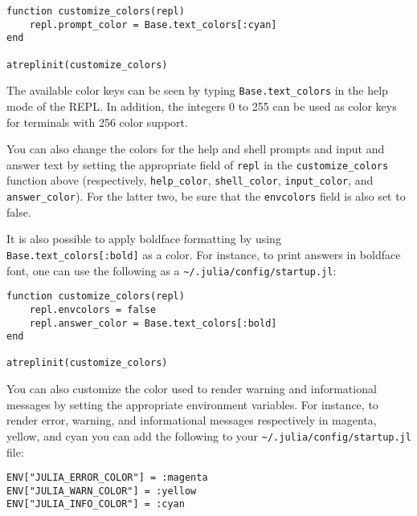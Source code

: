 \begin{verbatim}
function customize_colors(repl)
    repl.prompt_color = Base.text_colors[:cyan]
end

atreplinit(customize_colors)
\end{verbatim}



The available color keys can be seen by typing \texttt{Base.text\_colors} in the help mode of the REPL. In addition, the integers 0 to 255 can be used as color keys for terminals with 256 color support.



You can also change the colors for the help and shell prompts and input and answer text by setting the appropriate field of \texttt{repl} in the \texttt{customize\_colors} function above (respectively, \texttt{help\_color}, \texttt{shell\_color}, \texttt{input\_color}, and \texttt{answer\_color}). For the latter two, be sure that the \texttt{envcolors} field is also set to false.



It is also possible to apply boldface formatting by using \texttt{Base.text\_colors[:bold]} as a color. For instance, to print answers in boldface font, one can use the following as a \texttt{{\textasciitilde}/.julia/config/startup.jl}:




\begin{verbatim}
function customize_colors(repl)
    repl.envcolors = false
    repl.answer_color = Base.text_colors[:bold]
end

atreplinit(customize_colors)
\end{verbatim}



You can also customize the color used to render warning and informational messages by setting the appropriate environment variables. For instance, to render error, warning, and informational messages respectively in magenta, yellow, and cyan you can add the following to your \texttt{{\textasciitilde}/.julia/config/startup.jl} file:




\begin{verbatim}
ENV["JULIA_ERROR_COLOR"] = :magenta
ENV["JULIA_WARN_COLOR"] = :yellow
ENV["JULIA_INFO_COLOR"] = :cyan
\end{verbatim}



\hypertarget{12083895020192706202}{}



